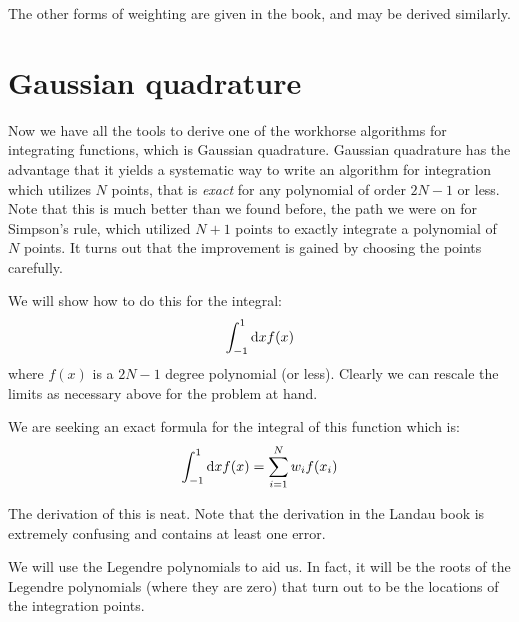 The other forms of weighting are given in the book, and may be derived
similarly. 

\section{Gaussian quadrature}

Now we have all the tools to derive one of the workhorse algorithms
for integrating functions, which is Gaussian quadrature. Gaussian
quadrature has the advantage that it yields a systematic way to write
an algorithm for integration which utilizes $N$ points, that is {\it
  exact} for any polynomial of order $2N-1$ or less. Note that this is
much better than we found before, the path we were on for Simpson's
rule, which utilized $N+1$ points to exactly integrate a polynomial of
$N$ points. It turns out that the improvement is gained by choosing
the points carefully.

We will show how to do this for the integral:
\begin{equation}
\int_{-1}^{1} {\rm d}x f(x)
\end{equation}
where $f(x)$ is a $2N-1$ degree polynomial (or less).  Clearly we can
rescale the limits as necessary above for the problem at hand.

We are seeking an exact formula for the integral of this function
which is:
\begin{equation}
\int_{-1}^{1} {\rm d}x f(x) = \sum_{i=1}^N w_i f(x_i)
\end{equation}

The derivation of this is neat. Note that the derivation in the Landau
book is extremely confusing and contains at least one error.

We will use the Legendre polynomials to aid us. In fact, it will be
the roots of the Legendre polynomials (where they are zero) that turn
out to be the locations of the integration points.


